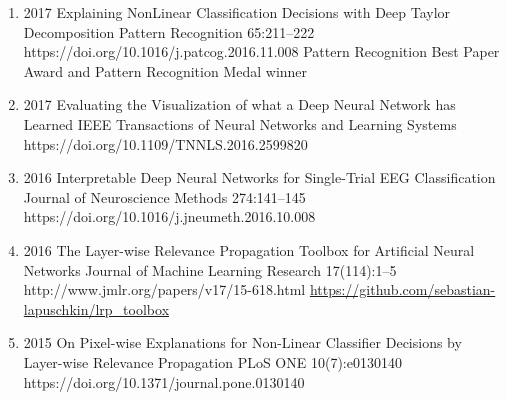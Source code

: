 {\begin{enumerate}
    \item {}
                            {2017}
                            {Explaining NonLinear Classification Decisions with Deep Taylor Decomposition}
                            {Pattern Recognition}
                            {65:211--222}
                            {https://doi.org/10.1016/j.patcog.2016.11.008}
                            {Pattern Recognition Best Paper Award and Pattern Recognition Medal winner}

    \item {}
                        {2017}
                        {Evaluating the Visualization of what a Deep Neural Network has Learned}
                        {IEEE Transactions of Neural Networks and Learning Systems}
                        {}
                        {https://doi.org/10.1109/TNNLS.2016.2599820}

    \item {}
                        {2016}
                        {Interpretable Deep Neural Networks for Single-Trial EEG Classification}
                        {Journal of Neuroscience Methods}
                        {274:141--145}
                        {https://doi.org/10.1016/j.jneumeth.2016.10.008}

    \item {}
                        {2016}
                        {The Layer-wise Relevance Propagation Toolbox for Artificial Neural Networks}
                        {Journal of Machine Learning Research}
                        {17(114):1--5}
                        {http://www.jmlr.org/papers/v17/15-618.html}
                        {\href{https://github.com/sebastian-lapuschkin/lrp_toolbox}{https://github.com/sebastian-lapuschkin/lrp\_toolbox}}

    \item {}
                        {2015}
                        {On Pixel-wise Explanations for Non-Linear Classifier Decisions by Layer-wise Relevance Propagation}
                        {PLoS ONE}
                        {10(7):e0130140}
                        {https://doi.org/10.1371/journal.pone.0130140}
\end{enumerate}
}